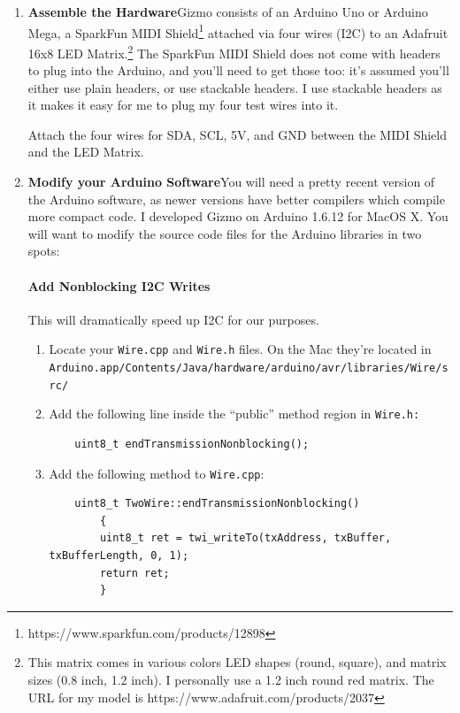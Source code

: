 \documentclass{article}
\begin{document}
\begin{enumerate}

\item {\bf Assemble the Hardware}\quad Gizmo consists of an Arduino Uno or Arduino Mega, a SparkFun MIDI Shield\footnote{https:/\!/www.sparkfun.com/products/12898} attached via four wires (I2C) to an Adafruit 16x8 LED Matrix.\footnote{This matrix comes in various colors LED shapes (round, square), and matrix sizes (0.8 inch, 1.2 inch).  I personally use a 1.2 inch round red matrix.  The URL for my model is https:/\!/www.adafruit.com/products/2037}  The SparkFun MIDI Shield does not come with headers to plug into the Arduino, and you'll need to get those too: it's assumed you'll either use plain headers, or use stackable headers.  I use stackable headers as it makes it easy for me to plug my four test wires into it.

Attach the four wires for SDA, SCL, 5V, and GND between the MIDI Shield and the LED Matrix.  

\item {\bf Modify your Arduino Software}\quad You will need a pretty recent version of the Arduino software, as newer versions have better compilers which compile more compact code.  I developed Gizmo on Arduino 1.6.12 for MacOS X.  You will want to modify the source code files for the Arduino libraries in two spots:

\paragraph{Add Nonblocking I2C Writes}  This will dramatically speed up I2C for our purposes.
\begin{enumerate}
\item Locate your \texttt{Wire.cpp} and \texttt{Wire.h} files.  On the Mac they're located in\\\texttt{Arduino.app/Contents/Java/hardware/arduino/avr/libraries/Wire/src/}

\item Add the following line inside the ``public'' method region in \texttt{Wire.h:}

\begin{verbatim}
    uint8_t endTransmissionNonblocking();
\end{verbatim}

\item Add the following method to \texttt{Wire.cpp}:

\begin{verbatim}
    uint8_t TwoWire::endTransmissionNonblocking()
        {
        uint8_t ret = twi_writeTo(txAddress, txBuffer, txBufferLength, 0, 1);
        return ret;
        }
\end{verbatim}
\end{enumerate}


\end{enumerate}
\end{document}
